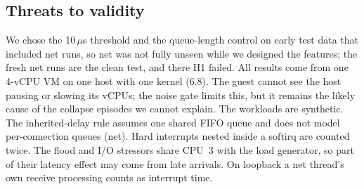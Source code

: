 \subsection{Threats to validity}
We chose the 10\,$\mu$s threshold and the queue-length control on early
test data that included net runs, so net was not fully unseen while we
designed the features; the fresh net runs are the clean test, and there H1
failed. All results come from one 4-vCPU VM on one host with one kernel
(6.8). The guest cannot see the host pausing or slowing its vCPUs; the
noise gate limits this, but it remains the likely cause of the collapse
episodes we cannot explain. The workloads are synthetic. The
inherited-delay rule assumes one shared FIFO queue and does not model
per-connection queues (net). Hard interrupts nested inside a softirq are
counted twice. The flood and I/O stressors share CPU~3 with the load
generator, so part of their latency effect may come from late arrivals.
On loopback a net thread's own receive processing counts
as interrupt time.
